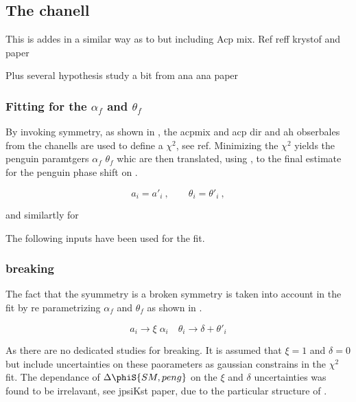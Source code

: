 \subsection{The \BsJpsiRho chanell}

This is addes in a similar way as to \BsJpsiKst but including Acp mix.
Ref reff krystof and paper

Plus several hypothesis {\color{red} study a bit from ana ana paper}



\subsubsection{Fitting for the $\alpha_f$ and $\theta_f$}

By invoking \grpsuthree symmetry, as shown in , the acpmix and acp dir and ah obserbales from the chanells \BsJpsiPhi \BsJpsiRho \BsJpsiKst
are used to define a $\chi^2$, see ref. Minimizing the $\chi^2$ yields the penguin paramtgers $\alpha_f$ $\theta_f$ whic are
then translated, using , to the final estimate for the penguin phase shift on \phis.

\begin{equation}
a_i = a'_i\:,\qquad \theta_i = \theta'_i\:,
\label{su3_apply}
\end{equation}

and similartly for \BsJpsiRho

The following inputs have been used for the fit.

\subsubsection{\grpsuthree breaking}
\label{su3_breaking}

The fact that the \grpsuthree syummetry is a broken symmetry is taken into account in the fit by re parametrizing
$\alpha_f$ and $\theta_f$ as shown in .

\begin{equation}
a_i \to \xi \; \alpha_i \quad \theta_i \to \delta + \theta'_i
\label{su3_breaking}
\end{equation}

As there are no dedicated studies for \grpsuthree breaking. It is assumed that $\xi=1$ and $\delta=0$ but include uncertainties
on these paorameters as gaussian constrains in the $\chi^2$ fit. The dependance of $\Delta\phiS{SM,peng}$ on the $\xi$ and $\delta$
uncertainties was found to be irrelavant, {\color{red} see jpsiKst paper}, due to the particular structure of .
